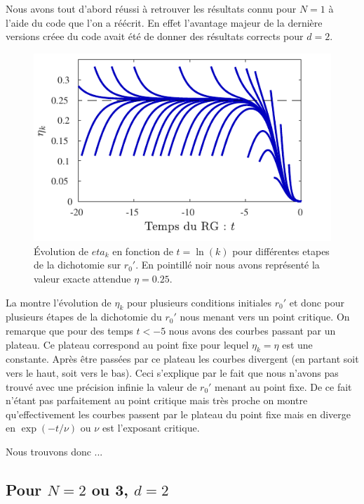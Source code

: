 \documentclass[10pt]{article}
\begin{document}
\begin{multicols}{2}
Nous avons tout d'abord réussi à retrouver les résultats connu pour $N=1$ à l'aide du code que l'on a réécrit. En effet l'avantage majeur de la dernière versions créee du code avait été de donner des résultats corrects pour $d = 2$.

\begin{figure}[H]
	\begin{center}
		\includegraphics[width=0.95\columnwidth]{etakd2.pdf}
		\caption{Évolution de $eta_k$ en fonction de $t= \ln(k)$ pour différentes etapes de la dichotomie sur $r_0'$. En pointillé noir nous avons représenté la valeur exacte attendue $\eta = 0.25$. }
		\label{fig:etakd2}
	\end{center}
\end{figure}

La  montre l'évolution de $\eta_k$ pour plusieurs conditions initiales $r_0'$ et donc pour plusieurs étapes de la dichotomie du $r_0'$ nous menant vers un point critique. On remarque que pour des temps $t<-5$ nous avons des courbes passant par un plateau. Ce plateau correspond au point fixe pour lequel $\eta_k = \eta$ est une constante. Après être passées par ce plateau les courbes divergent (en partant soit vers le haut, soit vers le bas). Ceci s'explique par le fait que nous n'avons pas trouvé avec une précision infinie la valeur de $r_0'$ menant au point fixe. De ce fait n'étant pas parfaitement au point critique mais très proche on montre qu'effectivement les courbes passent par le plateau du point fixe mais en diverge en $\exp(-t/\nu)$ ou $\nu$ est l'exposant critique.

Nous trouvons donc ...\\



\subsection{Pour $N = 2$ ou 3, $d=2$}


\end{multicols}
\end{document}

